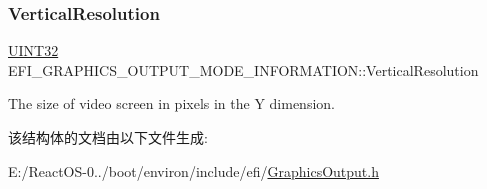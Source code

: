 \subsubsection{\texorpdfstring{Vertical\+Resolution}{VerticalResolution}}
{\footnotesize\ttfamily \hyperlink{_processor_bind_8h_ae1e6edbbc26d6fbc71a90190d0266018}{U\+I\+N\+T32} E\+F\+I\+\_\+\+G\+R\+A\+P\+H\+I\+C\+S\+\_\+\+O\+U\+T\+P\+U\+T\+\_\+\+M\+O\+D\+E\+\_\+\+I\+N\+F\+O\+R\+M\+A\+T\+I\+O\+N\+::\+Vertical\+Resolution}

The size of video screen in pixels in the Y dimension. 

该结构体的文档由以下文件生成\+:\begin{DoxyCompactItemize}
\item 
E\+:/\+React\+O\+S-\/0../boot/environ/include/efi/\hyperlink{_graphics_output_8h}{Graphics\+Output.\+h}\end{DoxyCompactItemize}

